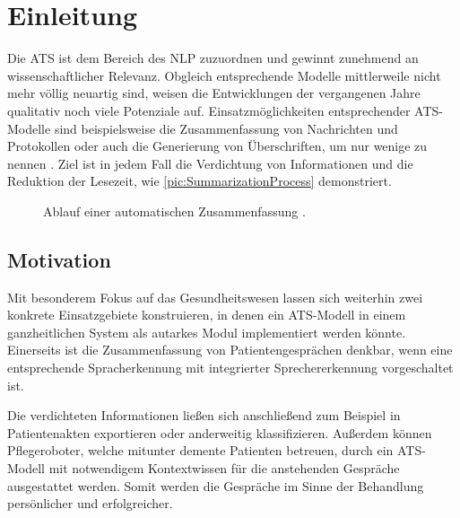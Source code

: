 \chapter{Einleitung}
\thispagestyle{fancy}
\label{chap:Einleitung}

\noindent
Die \ac{ATS} ist dem Bereich des \ac{NLP} zuzuordnen und gewinnt zunehmend an wissenschaftlicher Relevanz. Obgleich entsprechende Modelle mittlerweile nicht mehr völlig neuartig sind, weisen die Entwicklungen der vergangenen Jahre qualitativ noch viele Potenziale auf. Einsatzmöglichkeiten entsprechender \ac{ATS}-Modelle sind beispielsweise die Zusammenfassung von Nachrichten und Protokollen oder auch die Generierung von Überschriften, um nur wenige zu nennen \cite{GON20}. Ziel ist in jedem Fall die Verdichtung von Informationen und die Reduktion der Lesezeit, wie \autoref{pic:SummarizationProcess} demonstriert.\\

\begin{figure}[h]
  \centering
  \caption{Ablauf einer automatischen Zusammenfassung \cite{THA19}.}
  \label{pic:SummarizationProcess}
\end{figure}

\section{Motivation}
\noindent
Mit besonderem Fokus auf das Gesundheitswesen lassen sich weiterhin zwei konkrete Einsatzgebiete konstruieren, in denen ein \ac{ATS}-Modell in einem ganzheitlichen System als autarkes Modul implementiert werden könnte. Einerseits ist die Zusammenfassung von Patientengesprächen denkbar, wenn eine entsprechende Spracherkennung mit integrierter Sprechererkennung vorgeschaltet ist.
\newpage

\noindent
Die verdichteten Informationen ließen sich anschließend zum Beispiel in Patientenakten exportieren oder anderweitig klassifizieren. Außerdem können Pflegeroboter, welche mitunter demente Patienten betreuen, durch ein \ac{ATS}-Modell mit notwendigem Kontextwissen für die anstehenden Gespräche ausgestattet werden. Somit werden die Gespräche im Sinne der Behandlung persönlicher und erfolgreicher.\\

